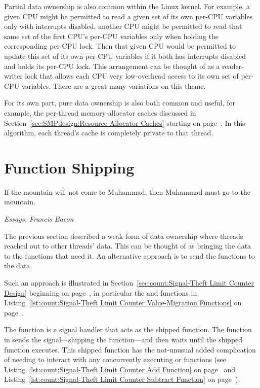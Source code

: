 Partial data ownership is also common within the Linux kernel.
For example, a given CPU might be permitted to read a given set of its
own per-CPU variables only with interrupts disabled, another CPU might
be permitted to read that same set of the first CPU's per-CPU variables
only when holding the corresponding per-CPU lock.
Then that given CPU would be permitted to update this set of its own
per-CPU variables if it both has interrupts disabled and holds its
per-CPU lock.
This arrangement can be thought of as a reader-writer lock that allows
each CPU very low-overhead access to its own set of per-CPU variables.
There are a great many variations on this theme.

For its own part, pure data ownership is also both common and useful,
for example, the per-thread memory-allocator caches discussed in
Section~\ref{sec:SMPdesign:Resource Allocator Caches}
starting on
page~\pageref{sec:SMPdesign:Resource Allocator Caches}.
In this algorithm, each thread's cache is completely private to that
thread.

\section{Function Shipping}
\label{sec:owned:Function Shipping}
%
\epigraph{If the mountain will not come to Muhammad, then Muhammad must
	  go to the mountain.}
	 {\emph{Essays, Francis Bacon}}

The previous section described a weak form of data ownership where
threads reached out to other threads' data.
This can be thought of as bringing the data to the functions that
need it.
An alternative approach is to send the functions to the data.

Such an approach is illustrated in
Section~\ref{sec:count:Signal-Theft Limit Counter Design}
beginning on
page~\pageref{sec:count:Signal-Theft Limit Counter Design},
in particular the  and
 functions in
Listing~\ref{lst:count:Signal-Theft Limit Counter Value-Migration Functions}
on
page~\pageref{lst:count:Signal-Theft Limit Counter Value-Migration Functions}.

The  function is a signal handler that
acts as the shipped function.
The  function in 
sends the signal---shipping the function---and then waits until
the shipped function executes.
This shipped function has the not-unusual added complication of
needing to interact with any concurrently executing 
or  functions (see
Listing~\ref{lst:count:Signal-Theft Limit Counter Add Function}
on
page~\pageref{lst:count:Signal-Theft Limit Counter Add Function} and
Listing~\ref{lst:count:Signal-Theft Limit Counter Subtract Function}
on
page~\pageref{lst:count:Signal-Theft Limit Counter Subtract Function}).

